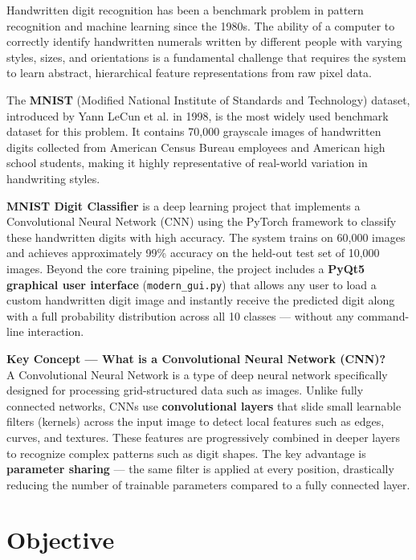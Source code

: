 \documentclass[12pt,a4paper,openany]{report}
\begin{document}
Handwritten digit recognition has been a benchmark problem in pattern recognition and machine learning since the 1980s. The ability of a computer to correctly identify handwritten numerals written by different people with varying styles, sizes, and orientations is a fundamental challenge that requires the system to learn abstract, hierarchical feature representations from raw pixel data.

The \textbf{MNIST} (Modified National Institute of Standards and Technology) dataset, introduced by Yann LeCun et al. in 1998, is the most widely used benchmark dataset for this problem. It contains 70,000 grayscale images of handwritten digits collected from American Census Bureau employees and American high school students, making it highly representative of real-world variation in handwriting styles.

\textbf{MNIST Digit Classifier} is a deep learning project that implements a Convolutional Neural Network (CNN) using the PyTorch framework to classify these handwritten digits with high accuracy. The system trains on 60,000 images and achieves approximately 99\% accuracy on the held-out test set of 10,000 images. Beyond the core training pipeline, the project includes a \textbf{PyQt5 graphical user interface} (\texttt{modern\_gui.py}) that allows any user to load a custom handwritten digit image and instantly receive the predicted digit along with a full probability distribution across all 10 classes --- without any command-line interaction.

\begin{conceptbox}
\textbf{Key Concept --- What is a Convolutional Neural Network (CNN)?}\\
A Convolutional Neural Network is a type of deep neural network specifically designed for processing grid-structured data such as images. Unlike fully connected networks, CNNs use \textbf{convolutional layers} that slide small learnable filters (kernels) across the input image to detect local features such as edges, curves, and textures. These features are progressively combined in deeper layers to recognize complex patterns such as digit shapes. The key advantage is \textbf{parameter sharing} --- the same filter is applied at every position, drastically reducing the number of trainable parameters compared to a fully connected layer.
\end{conceptbox}

\section{Objective}
\end{document}
